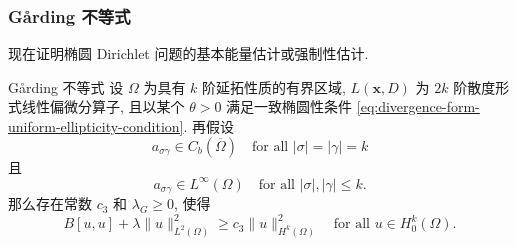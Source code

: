 \subsubsection{Gårding 不等式}\label{subsec:elliptic-garding-inequality}

现在证明椭圆 Dirichlet 问题的基本能量估计或强制性估计.

\begin{Theorem}{Gårding 不等式}
\label{thm:garding-elliptic-energy-inequality}
设 $\Omega$ 为具有 $k$ 阶延拓性质的有界区域, $L(\bm{x},D)$ 为 $2k$ 阶散度形式线性偏微分算子, 且以某个 $\theta>0$ 满足一致椭圆性条件 \eqref{eq:divergence-form-uniform-ellipticity-condition}. 再假设
\begin{equation}\label{eq:garding-principal-coefficient-continuity}
a_{\sigma\gamma}\in C_b(\overline\Omega)\quad\text{for all }|\sigma|=|\gamma|=k
\end{equation}
且
\begin{equation}\label{eq:garding-lower-coefficient-boundedness}
a_{\sigma\gamma}\in L^\infty(\Omega)\quad\text{for all }|\sigma|,|\gamma|\leq k.
\end{equation}
那么存在常数 $c_3$ 和 $\lambda_G\geq0$, 使得
\begin{equation}\label{eq:garding-elliptic-energy-inequality}
B[u,u]+\lambda\|u\|_{L^2(\Omega)}^2\geq c_3\|u\|_{H^k(\Omega)}^2\quad\text{for all }u\in H_0^k(\Omega).
\end{equation}

\end{Theorem}

